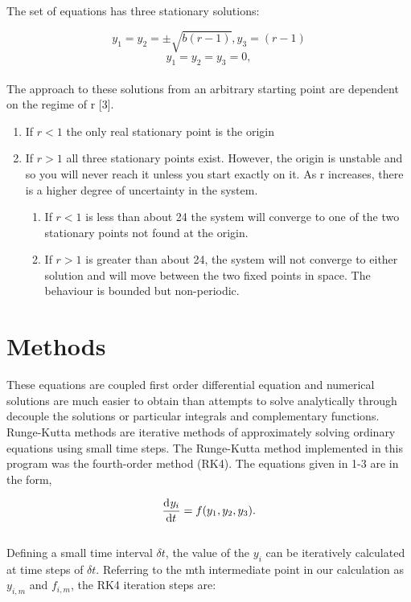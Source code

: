\documentclass[a4paper,11pt]{article}
\begin{document}
The set of equations has three stationary solutions:

\begin{equation}
y_{1} = y_{2} = \pm \sqrt{b(r-1)} , y_{3} = (r-1)
\end{equation}
\begin{equation}
y_{1} = y_{2} = y_{3} = 0, 
\end{equation}
\\
The approach to these solutions from an arbitrary starting point are dependent on the regime of r [3].

\begin{enumerate}
\item 
If $r<1$ the only real stationary point is the origin
\item 
If $r>1$ all three stationary points exist. However, the origin is unstable and so you will never reach it unless
you start exactly on it. As r increases, there is a higher degree of uncertainty in the system.
\begin{enumerate}
\item 
If $r<1$ is less than about 24 the system will converge to one of the two stationary points not found at the origin.
\item 
If $r>1$ is greater than about 24, the system will not converge to either solution and will move between the two fixed points in space. The behaviour is bounded but non-periodic.

\end{enumerate}


\end{enumerate}




\section{Methods}



These equations are coupled first order differential equation and numerical solutions are much easier to obtain than attempts to solve analytically through decouple the solutions or particular integrals and complementary functions. Runge-Kutta methods are iterative methods of approximately solving ordinary equations using small time steps. The Runge-Kutta method implemented in this program was the fourth-order method (RK4). The equations given in 1-3 are in the form,

\begin{equation}
\dod{y_i}{t} = f(y_{1},y_{2},y_{3}).
\end{equation}
\\
Defining a small time interval $\delta t$, the value of the $y_{i}$ can be iteratively calculated at time steps of $\delta t$. Referring to the mth intermediate point in our calculation as $y_{i,m}$ and $f_{i,m}$, the RK4 iteration steps are:
\end{document}
